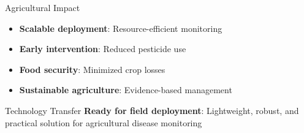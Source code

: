 \documentclass[aspectratio=43]{beamer}
\begin{document}
\begin{frame}
\begin{columns}
\begin{column}{0.5\textwidth}
            \begin{block}{Agricultural Impact}
                \begin{itemize}
                    \item \textbf{Scalable deployment}: Resource-efficient monitoring
                    \item \textbf{Early intervention}: Reduced pesticide use
                    \item \textbf{Food security}: Minimized crop losses
                    \item \textbf{Sustainable agriculture}: Evidence-based management
                \end{itemize}
            \end{block}
            
            \begin{exampleblock}{Technology Transfer}
                \textbf{Ready for field deployment}: Lightweight, robust, and practical solution for agricultural disease monitoring
            \end{exampleblock}
        \end{column}
    \end{columns}
\end{frame}
\end{document}
